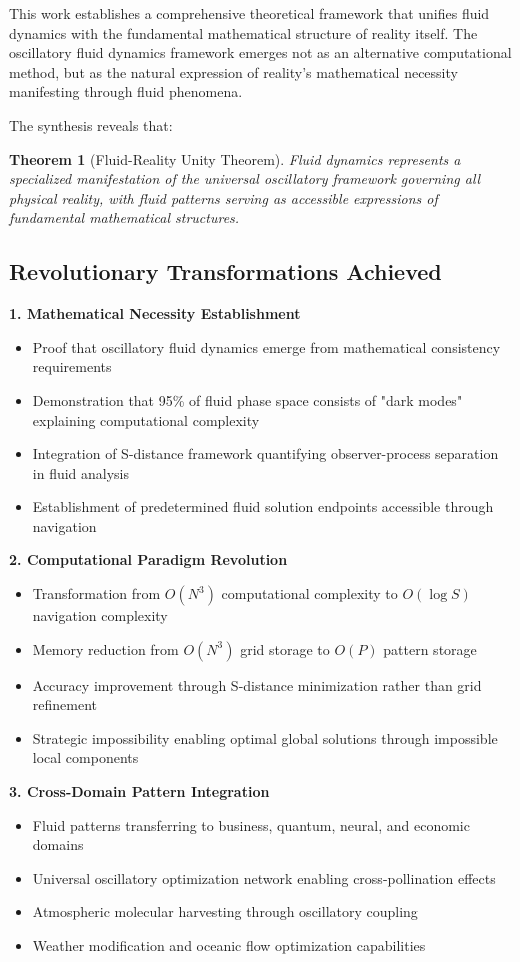 \documentclass[12pt,a4paper]{article}
\newtheorem{theorem}{Theorem}
\begin{document}
This work establishes a comprehensive theoretical framework that unifies fluid dynamics with the fundamental mathematical structure of reality itself. The oscillatory fluid dynamics framework emerges not as an alternative computational method, but as the natural expression of reality's mathematical necessity manifesting through fluid phenomena.

The synthesis reveals that:

\begin{theorem}[Fluid-Reality Unity Theorem]
Fluid dynamics represents a specialized manifestation of the universal oscillatory framework governing all physical reality, with fluid patterns serving as accessible expressions of fundamental mathematical structures.
\end{theorem}

\subsection{Revolutionary Transformations Achieved}

\textbf{1. Mathematical Necessity Establishment}
\begin{itemize}
\item Proof that oscillatory fluid dynamics emerge from mathematical consistency requirements
\item Demonstration that 95\% of fluid phase space consists of "dark modes" explaining computational complexity
\item Integration of S-distance framework quantifying observer-process separation in fluid analysis
\item Establishment of predetermined fluid solution endpoints accessible through navigation
\end{itemize}

\textbf{2. Computational Paradigm Revolution}
\begin{itemize}
\item Transformation from $O(N^3)$ computational complexity to $O(\log S)$ navigation complexity
\item Memory reduction from $O(N^3)$ grid storage to $O(P)$ pattern storage
\item Accuracy improvement through S-distance minimization rather than grid refinement
\item Strategic impossibility enabling optimal global solutions through impossible local components
\end{itemize}

\textbf{3. Cross-Domain Pattern Integration}
\begin{itemize}
\item Fluid patterns transferring to business, quantum, neural, and economic domains
\item Universal oscillatory optimization network enabling cross-pollination effects
\item Atmospheric molecular harvesting through oscillatory coupling
\item Weather modification and oceanic flow optimization capabilities
\end{itemize}
\end{document}

